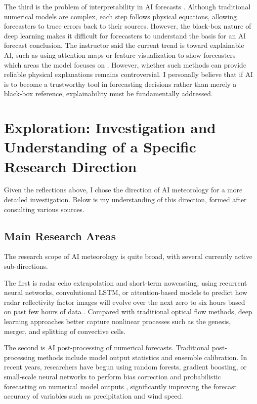 \documentclass{article}
\begin{document}
The third is the problem of interpretability in AI forecasts \cite{Ham2020Deep}. Although traditional numerical models are complex, each step follows physical equations, allowing forecasters to trace errors back to their sources. However, the black-box nature of deep learning makes it difficult for forecasters to understand the basis for an AI forecast conclusion. The instructor said the current trend is toward explainable AI, such as using attention maps or feature visualization to show forecasters which areas the model focuses on \cite{Tjoa2020Survey}. However, whether such methods can provide reliable physical explanations remains controversial. I personally believe that if AI is to become a trustworthy tool in forecasting decisions rather than merely a black-box reference, explainability must be fundamentally addressed.

\section{Exploration: Investigation and Understanding of a Specific Research Direction}

Given the reflections above, I chose the direction of AI meteorology for a more detailed investigation. Below is my understanding of this direction, formed after consulting various sources.

\subsection{Main Research Areas}

The research scope of AI meteorology is quite broad, with several currently active sub-directions.

The first is radar echo extrapolation and short-term nowcasting, using recurrent neural networks, convolutional LSTM, or attention-based models to predict how radar reflectivity factor images will evolve over the next zero to six hours based on past few hours of data \cite{Shi2015Convolutional}. Compared with traditional optical flow methods, deep learning approaches better capture nonlinear processes such as the genesis, merger, and splitting of convective cells.

The second is AI post-processing of numerical forecasts. Traditional post-processing methods include model output statistics and ensemble calibration. In recent years, researchers have begun using random forests, gradient boosting, or small-scale neural networks to perform bias correction and probabilistic forecasting on numerical model outputs \cite{Rasp2018Deep}, significantly improving the forecast accuracy of variables such as precipitation and wind speed.
\end{document}
